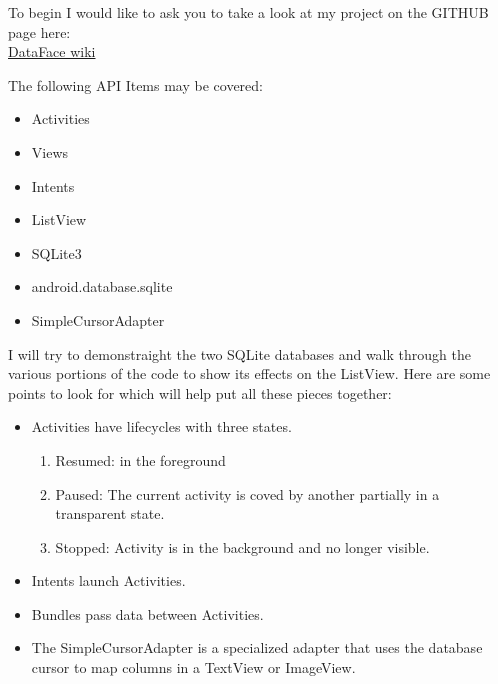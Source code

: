 \documentclass[fontsize=11pt, %
paper=a4, %
twoside, %
captions=tableheading,
index=totoc,
hyperref]{labbook}
\begin{document}
\pagestyle{scrheadings} %


\labday{\today}

To begin I would like to ask you to take a look at my project on the GITHUB page here:\\
\href{https://github.com/trentonknight/DataFaceProject/wiki/DataFace:-An-attempt-to-create-a-Object-based-learning-tool.}{DataFace wiki}

The following API Items may be covered:

\begin{itemize}
\item Activities~\citep{Activity}
\item Views ~\citep{View}
\item Intents ~\citep{Intent}
\item ListView ~\citep{ListView}
\end{itemize}

\begin{itemize}
\item SQLite3 ~\citep{sqlite}
\item android.database.sqlite ~\citep{ads}
\item SimpleCursorAdapter ~\citep{SimpleCursorAdapter}
\end{itemize}
I will try to demonstraight the two SQLite databases and walk through the various portions of the code to show its effects on the ListView.
Here are some points to look for which will help put all these pieces together:
\begin{itemize}
\item Activities have lifecycles with three states.
\begin{enumerate}
\item Resumed: in the foreground
\item Paused: The current activity is coved by another partially in a transparent state.
\item Stopped: Activity is in the background and no longer visible.
\end{enumerate}
\item Intents launch Activities.
\item Bundles pass data between Activities.
\item The SimpleCursorAdapter is a specialized adapter that uses the database cursor to map columns in a TextView or ImageView.
\end{itemize}

\clearpage
\printbibliography
\end{document}
